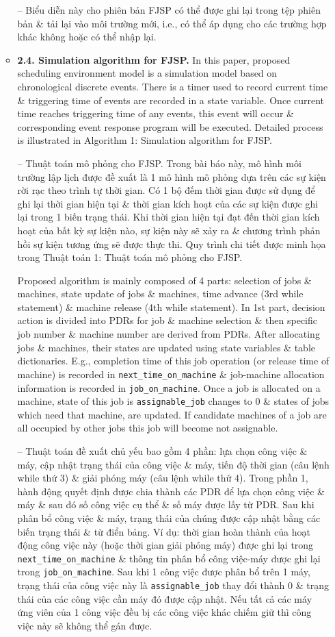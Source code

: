 \documentclass{article}
\begin{document}
\begin{itemize}
\begin{itemize}
        -- Biểu diễn này cho phiên bản FJSP có thể được ghi lại trong tệp phiên bản \& tải lại vào môi trường mới, i.e., có thể áp dụng cho các trường hợp khác không hoặc có thể nhập lại.
        \item {\bf2.4. Simulation algorithm for FJSP.} In this paper, proposed scheduling environment model is a simulation model based on chronological discrete events. There is a timer used to record current time \& triggering time of events are recorded in a state variable. Once current time reaches triggering time of any events, this event will occur \& corresponding event response program will be executed. Detailed process is illustrated in {\sf Algorithm 1: Simulation algorithm for FJSP}.

        -- {\sf Thuật toán mô phỏng cho FJSP.} Trong bài báo này, mô hình môi trường lập lịch được đề xuất là 1 mô hình mô phỏng dựa trên các sự kiện rời rạc theo trình tự thời gian. Có 1 bộ đếm thời gian được sử dụng để ghi lại thời gian hiện tại \& thời gian kích hoạt của các sự kiện được ghi lại trong 1 biến trạng thái. Khi thời gian hiện tại đạt đến thời gian kích hoạt của bất kỳ sự kiện nào, sự kiện này sẽ xảy ra \& chương trình phản hồi sự kiện tương ứng sẽ được thực thi. Quy trình chi tiết được minh họa trong {\sf Thuật toán 1: Thuật toán mô phỏng cho FJSP}.

        Proposed algorithm is mainly composed of 4 parts: selection of jobs \& machines, state update of jobs \& machines, time advance (3rd while statement) \& machine release (4th while statement). In 1st part, decision action is divided into PDRs for job \& machine selection \& then specific job number \& machine number are derived from PDRs. After allocating jobs \& machines, their states are updated using state variables \& table dictionaries. E.g., completion time of this job operation (or release time of machine) is recorded in \verb|next_time_on_machine| \& job-machine allocation information is recorded in \verb|job_on_machine|. Once a job is allocated on a machine, state of this job is \verb|assignable_job| changes to 0 \& states of jobs which need that machine, are updated. If candidate machines of a job are all occupied by other jobs this job will become not assignable.

        -- Thuật toán đề xuất chủ yếu bao gồm 4 phần: lựa chọn công việc \& máy, cập nhật trạng thái của công việc \& máy, tiến độ thời gian (câu lệnh while thứ 3) \& giải phóng máy (câu lệnh while thứ 4). Trong phần 1, hành động quyết định được chia thành các PDR để lựa chọn công việc \& máy \& sau đó số công việc cụ thể \& số máy được lấy từ PDR. Sau khi phân bổ công việc \& máy, trạng thái của chúng được cập nhật bằng các biến trạng thái \& từ điển bảng. Ví dụ: thời gian hoàn thành của hoạt động công việc này (hoặc thời gian giải phóng máy) được ghi lại trong \verb|next_time_on_machine| \& thông tin phân bổ công việc-máy được ghi lại trong \verb|job_on_machine|. Sau khi 1 công việc được phân bổ trên 1 máy, trạng thái của công việc này là \verb|assignable_job| thay đổi thành 0 \& trạng thái của các công việc cần máy đó được cập nhật. Nếu tất cả các máy ứng viên của 1 công việc đều bị các công việc khác chiếm giữ thì công việc này sẽ không thể gán được.


\end{itemize}
\end{itemize}
\end{document}
